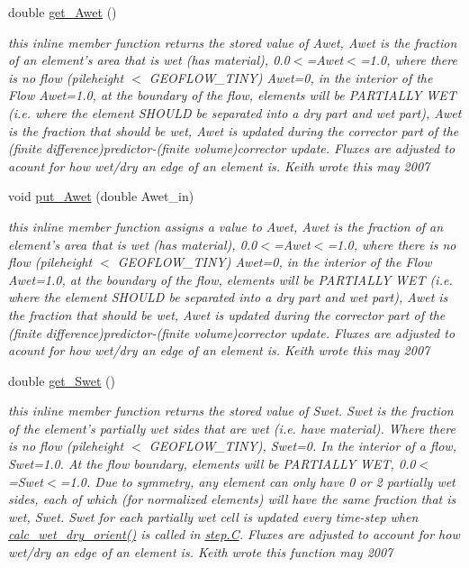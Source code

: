 \begin{CompactItemize}
double \hyperlink{classElement_a121}{get\_\-Awet} ()
\begin{CompactList}\small\item\em this inline member function returns the stored value of Awet, Awet is the fraction of an element's area that is wet (has material), 0.0$<$=Awet$<$=1.0, where there is no flow (pileheight $<$ GEOFLOW\_\-TINY) Awet=0, in the interior of the Flow Awet=1.0, at the boundary of the flow, elements will be PARTIALLY WET (i.e. where the element SHOULD be separated into a dry part and wet part), Awet is the fraction that should be wet, Awet is updated during the corrector part of the (finite difference)predictor-(finite volume)corrector update. Fluxes are adjusted to acount for how wet/dry an edge of an element is. Keith wrote this may 2007 \item\end{CompactList}\item 
void \hyperlink{classElement_a122}{put\_\-Awet} (double Awet\_\-in)
\begin{CompactList}\small\item\em this inline member function assigns a value to Awet, Awet is the fraction of an element's area that is wet (has material), 0.0$<$=Awet$<$=1.0, where there is no flow (pileheight $<$ GEOFLOW\_\-TINY) Awet=0, in the interior of the Flow Awet=1.0, at the boundary of the flow, elements will be PARTIALLY WET (i.e. where the element SHOULD be separated into a dry part and wet part), Awet is the fraction that should be wet, Awet is updated during the corrector part of the (finite difference)predictor-(finite volume)corrector update. Fluxes are adjusted to acount for how wet/dry an edge of an element is. Keith wrote this may 2007 \item\end{CompactList}\item 
double \hyperlink{classElement_a123}{get\_\-Swet} ()
\begin{CompactList}\small\item\em this inline member function returns the stored value of Swet. Swet is the fraction of the element's partially wet sides that are wet (i.e. have material). Where there is no flow (pileheight $<$ GEOFLOW\_\-TINY), Swet=0. In the interior of a flow, Swet=1.0. At the flow boundary, elements will be PARTIALLY WET, 0.0$<$=Swet$<$=1.0. Due to symmetry, any element can only have 0 or 2 partially wet sides, each of which (for normalized elements) will have the same fraction that is wet, Swet. Swet for each partially wet cell is updated every time-step when \hyperlink{classElement_a129}{calc\_\-wet\_\-dry\_\-orient()} is called in \hyperlink{constant_8h_a21}{step.C}. Fluxes are adjusted to account for how wet/dry an edge of an element is. Keith wrote this function may 2007 \item\end{CompactList}\item 

\end{CompactItemize}
